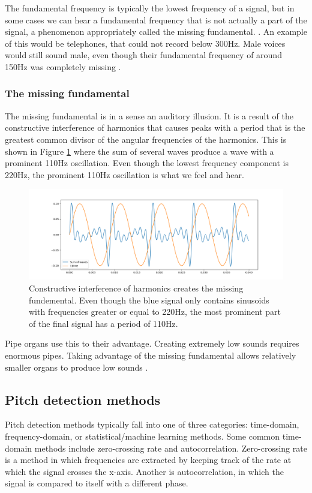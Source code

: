 The fundamental frequency is typically the lowest frequency of a signal, but in some cases we can hear a fundamental frequency that is not actually a part of the signal, a phenomenon appropriately called the missing fundamental. . An example of this would be telephones, that could not record below 300Hz. Male voices would still sound male, even though their fundamental frequency of around 150Hz was completely missing .

\subsubsection{The missing fundamental}
The missing fundamental is in a sense an auditory illusion. It is a result of the constructive interference of harmonics that causes peaks with a period that is the greatest common divisor of the angular frequencies of the harmonics. This is shown in Figure \ref{fig:missingfund} where the sum of several waves produce a wave with a prominent 110Hz oscillation. Even though the lowest frequency component is 220Hz, the prominent 110Hz oscillation is what we feel and hear.

\begin{figure}[ht]
    \centering
    \includegraphics[width=\textwidth]{./images/missingfund.png}
    \caption{Constructive interference of harmonics creates the missing fundemental. Even though the blue signal only contains sinusoids with frequencies greater or equal to 220Hz, the most prominent part of the final signal has a period of 110Hz. \label{fig:missingfund}}
\end{figure}

Pipe organs use this to their advantage. Creating extremely low sounds requires enormous pipes. Taking advantage of the missing fundamental allows relatively smaller organs to produce low sounds \cite{Veritasium2024}.

\subsection{Pitch detection methods}
Pitch detection methods typically fall into one of three categories: time-domain, frequency-domain, or statistical/machine learning methods. Some common time-domain methods include zero-crossing rate and autocorrelation. Zero-crossing rate is a method in which frequencies are extracted by keeping track of the rate at which the signal crosses the x-axis. Another is autocorrelation, in which the signal is compared to itself with a different phase. 

